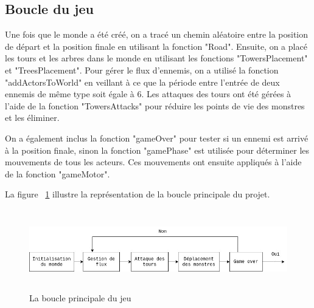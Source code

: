 \documentclass[11pt]{article}
\begin{document}
        \subsection{Boucle du jeu}
    
        Une fois que le monde a été créé, on a tracé un chemin aléatoire entre la position de départ et la position finale en utilisant la fonction "Road". Ensuite, on a placé les tours et les arbres dans le monde en utilisant les fonctions "TowersPlacement" et "TreesPlacement". Pour gérer le flux d'ennemis, on a utilisé la fonction "addActorsToWorld" en veillant à ce que la période entre l'entrée de deux ennemis de même type soit égale à 6. Les attaques des tours ont été gérées à l'aide de la fonction "TowersAttacks" pour réduire les points de vie des monstres et les éliminer. 
        
        On a également inclus la fonction "gameOver" pour tester si un ennemi est arrivé à la position finale, sinon la fonction "gamePhase" est utilisée pour déterminer les mouvements de tous les acteurs. Ces mouvements ont ensuite appliqués à l'aide de la fonction "gameMotor". 
        
        La figure ~\ref{fig: game_loop } illustre la représentation de la boucle principale du projet.
    \begin{figure}[h]
                \centering
                \includegraphics[height = 3.5cm, width = 16cm]{Diagramme sans nom (1).jpg}
                \caption{La boucle principale du jeu} 
                \label{fig: game_loop } 
            \end{figure}
\end{document}
